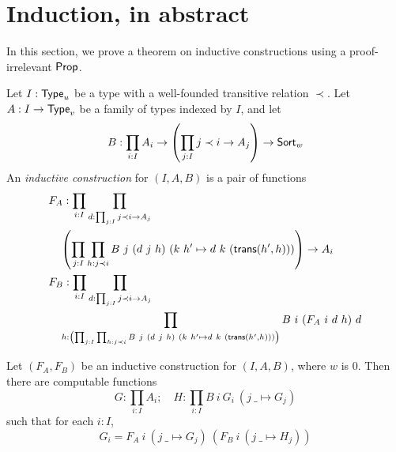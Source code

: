 \section{Induction, in abstract}
In this section, we prove a theorem on inductive constructions using a proof-irrelevant \( \mathsf{Prop} \).
\begin{definition}
  \label{def:IC}
  Let \( I : \mathsf{Type}_u \) be a type with a well-founded transitive relation \( \prec \).
  Let \( A : I \to \mathsf{Type}_v \) be a family of types indexed by \( I \), and let
  \[ B : \prod_{i : I} A_i \to \left(\prod_{j : I} j \prec i \to A_j\right) \to \mathsf{Sort}_w \]
  An \emph{inductive construction} for \( (I, A, B) \) is a pair of functions
  \begin{align*}
    &F_A : \prod_{i : I} \prod_{d : \prod_{j : I} j \prec i \to A_j} \\
    &\quad\left( \prod_{j : I} \prod_{h : j \prec i} B\ j\ (d\ j\ h)\ (k\ h' \mapsto d\ k\ (\newoperator{trans}(h',h))) \right) \to A_i \\
    &F_B : \prod_{i : I} \prod_{d : \prod_{j : I} j \prec i \to A_j} \\
    &\quad\prod_{h : \left( \prod_{j : I} \prod_{h : j \prec i} B\ j\ (d\ j\ h)\ (k\ h' \mapsto d\ k\ (\newoperator{trans}(h',h))) \right)} B\ i\ (F_A\ i\ d\ h)\ d
  \end{align*}
\end{definition}
\begin{proposition}
  \label{prop:IC.fix_prop}
  Let \( (F_A, F_B) \) be an inductive construction for \( (I, A, B) \), where \( w \) is \( 0 \).
  Then there are computable functions
  \[ G : \prod_{i : I} A_i;\quad H : \prod_{i : I} B\ i\ G_i\ (j\ \_ \mapsto G_j) \]
  such that for each \( i : I \),
  \[ G_i = F_A\ i\ (j\ \_ \mapsto G_j)\ (F_B\ i\ (j\ \_ \mapsto H_j)) \]
\end{proposition}
